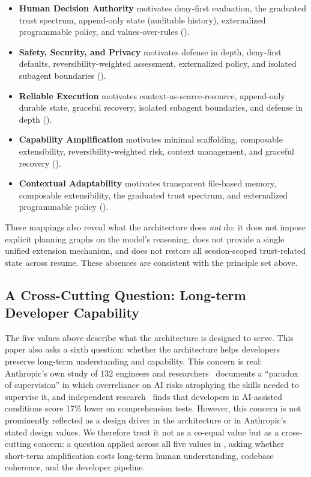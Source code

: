 \begin{itemize}[nosep]
  \item \textbf{Human Decision Authority} motivates deny-first evaluation, the graduated trust spectrum, append-only state (auditable history), externalized programmable policy, and values-over-rules ().
  \item \textbf{Safety, Security, and Privacy} motivates defense in depth, deny-first defaults, reversibility-weighted assessment, externalized policy, and isolated subagent boundaries ().
  \item \textbf{Reliable Execution} motivates context-as-scarce-resource, append-only durable state, graceful recovery, isolated subagent boundaries, and defense in depth ().
  \item \textbf{Capability Amplification} motivates minimal scaffolding, composable extensibility, reversibility-weighted risk, context management, and graceful recovery ().
  \item \textbf{Contextual Adaptability} motivates transparent file-based memory, composable extensibility, the graduated trust spectrum, and externalized programmable policy ().
\end{itemize}

These mappings also reveal what the architecture does \emph{not} do: it does not impose explicit planning graphs on the model's reasoning, does not provide a single unified extension mechanism, and does not restore all session-scoped trust-related state across resume. These absences are consistent with the principle set above.

\subsection{A Cross-Cutting Question: Long-term Developer Capability}
\label{sec:values:lens}

The five values above describe what the architecture is designed to serve. This paper also asks a sixth question: whether the architecture helps developers preserve long-term understanding and capability. This concern is real: Anthropic's own study of 132 engineers and researchers~\citep{anthropic2025internal} documents a ``paradox of supervision'' in which overreliance on AI risks atrophying the skills needed to supervise it, and independent research~\citep{shen2026skill} finds that developers in AI-assisted conditions score 17\% lower on comprehension tests. However, this concern is not prominently reflected as a design driver in the architecture or in Anthropic's stated design values. We therefore treat it not as a co-equal value but as a cross-cutting concern: a question applied across all five values in , asking whether short-term amplification costs long-term human understanding, codebase coherence, and the developer pipeline.
